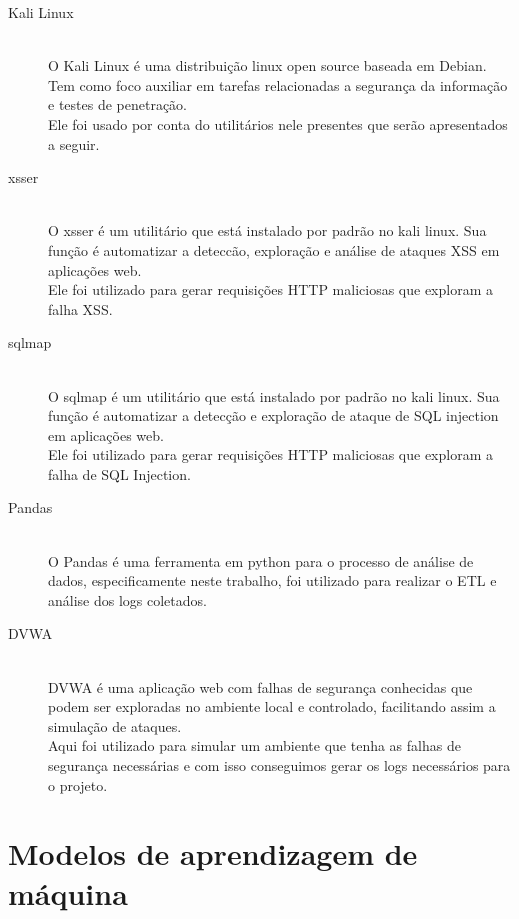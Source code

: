 \begin{description}
    \item[Kali Linux] \hfill \\ 
        O Kali Linux é uma distribuição linux open source baseada em Debian. 
        Tem como foco auxiliar em tarefas relacionadas a segurança da informação 
        e testes de penetração. \\
        Ele foi usado por conta do utilitários nele presentes que serão apresentados
        a seguir.
    \item[xsser] \hfill \\ 
        O xsser é um utilitário que está instalado por padrão no kali linux. Sua 
        função é automatizar a deteccão, exploração e análise de ataques XSS em 
        aplicações web. \\
        Ele foi utilizado para gerar requisições HTTP maliciosas que exploram a falha
        XSS.
    \item[sqlmap] \hfill \\ 
        O sqlmap é um utilitário que está instalado por padrão no kali linux. Sua
        função é automatizar a detecção e exploração de ataque de SQL injection em 
        aplicações web. \\
        Ele foi utilizado para gerar requisições HTTP maliciosas que exploram a falha
        de SQL Injection.
    \item[Pandas] \hfill \\ 
        O Pandas é uma ferramenta  em python para o processo de análise de dados, 
        especificamente neste trabalho, foi utilizado para realizar o ETL e análise 
        dos logs coletados.
    \item[DVWA] \hfill \\ 
        DVWA é uma aplicação web com falhas de segurança conhecidas que podem ser 
        exploradas no ambiente local e controlado, facilitando assim a simulação de
        ataques. \\ 
        Aqui foi utilizado para simular um ambiente que tenha as falhas de segurança 
        necessárias e com isso conseguimos gerar os logs necessários para o projeto.
  \end{description}

\section{Modelos de aprendizagem de máquina}

